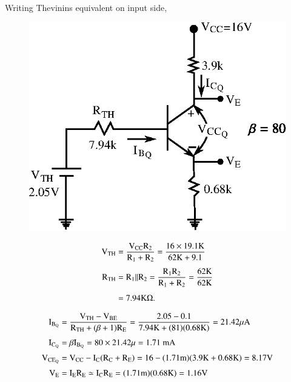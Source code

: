 \begin{solution}
Writing Thevinins equivalent on input side,

\noindent
\begin{minipage}[c]{7cm}
\begin{figure}[H]
\centering
\includegraphics{chap3/fig3.24.eps}
\end{figure}
\end{minipage}
\quad
\begin{minipage}[c]{7cm}
\begin{align*}
\textrm{V}_{\text{TH}} &= \frac{\textrm{V}_{\text{CC}}\textrm{R}_{2}}{\textrm{R}_{1}+\textrm{R}_{2}}=\frac{16\times 19.1\textrm{K}}{62\textrm{K}+9.1}\\[4pt]
\textrm{R}_{\text{TH}} &= \textrm{R}_{1}||\textrm{R}_{2} = \frac{\textrm{R}_{1}\textrm{R}_{2}}{\textrm{R}_{1}+\textrm{R}_{2}}=\frac{62\textrm{K}}{62\textrm{K}}\\[4pt]
&= 7.94\textrm{K}\Omega.
\end{align*}
\end{minipage}
\smallskip
\begin{align*}
\rmI_{\rmB_{\rmQ}} &= \frac{\rmV_{\text{TH}}-\rmV_{\text{BE}}}{\rmR_{\text{TH}}+(\beta+1)\rmR_{\rmE}}=\frac{2.05-0.1}{7.94\rmK+(81)(0.68\rmK)}=21.42\mu \rmA\\[3pt]
\rmI_{\rmC_{\rmQ}} &= \beta \rmI_{\rmB_{\rmQ}}=80\times 21.42\mu=1.71\text{~mA}\\[3pt]
\rmV_{\text{CE}_{\rmQ}} &= \rmV_{\text{CC}}-\rmI_{\rmC}(\rmR_{\rmC}+\rmR_{\rmE})=16-(1.71\rmm)(3.9\rmK+0.68\rmK)=8.17\rmV\\[3pt]
\rmV_{\rmE} &= \rmI_{\rmE}\rmR_{\rmE}\simeq \rmI_{\rmC}\rmR_{\rmE}=(1.71\rmm)(0.68\rmK)=1.16\rmV\\[3pt]

\end{align*}
\end{solution}
